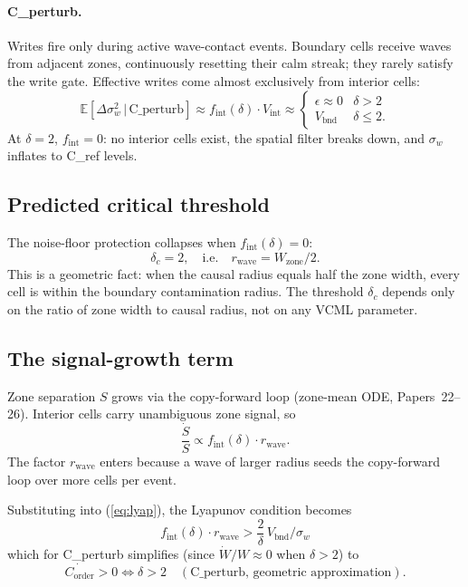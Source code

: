 \documentclass[11pt,a4paper]{article}
\newcommand{\Corder}{C_{\mathrm{order}}}
\newcommand{\sw}{\sigma_w}
\newcommand{\fint}{f_{\mathrm{int}}}
\begin{document}
\paragraph{C\_perturb.}
Writes fire only during active wave-contact events.
Boundary cells receive waves from adjacent zones, continuously resetting their
calm streak; they rarely satisfy the write gate.
Effective writes come almost exclusively from interior cells:
\begin{equation}
  \mathbb{E}[\Delta\sw^2 \,|\, \text{C\_perturb}]
    \approx f_\mathrm{int}(\delta)\cdot V_\mathrm{int}
    \approx \begin{cases}
      \epsilon \approx 0 & \delta > 2 \\
      V_\mathrm{bnd} & \delta \leq 2.
    \end{cases}
\end{equation}
At $\delta=2$, $\fint=0$: no interior cells exist, the spatial filter breaks down,
and $\sw$ inflates to C\_ref levels.

\subsection{Predicted critical threshold}

The noise-floor protection collapses when $\fint(\delta)=0$:
\begin{equation}
  \delta_c = 2, \quad\text{i.e.}\quad r_\mathrm{wave} = W_\mathrm{zone}/2.
\end{equation}
This is a geometric fact: when the causal radius equals half the zone width,
every cell is within the boundary contamination radius. The threshold $\delta_c$
depends only on the ratio of zone width to causal radius, not on any VCML
parameter.

\subsection{The signal-growth term}

Zone separation $S$ grows via the copy-forward loop (zone-mean ODE, Papers~22--26).
Interior cells carry unambiguous zone signal, so
\begin{equation}
  \frac{\dot{S}}{S} \propto \fint(\delta) \cdot r_\mathrm{wave}.
\end{equation}
The factor $r_\mathrm{wave}$ enters because a wave of larger radius seeds the
copy-forward loop over more cells per event.

Substituting into (\ref{eq:lyap}), the Lyapunov condition becomes
\begin{equation}
  \fint(\delta)\cdot r_\mathrm{wave} > \frac{2}{\delta}\,V_\mathrm{bnd}/\sw
\end{equation}
which for C\_perturb simplifies (since $\dot{W}/W \approx 0$ when $\delta>2$) to
\begin{equation}
  \dot{\Corder} > 0 \iff \delta > 2 \quad (\text{C\_perturb, geometric approximation}).
  \label{eq:geom_threshold}
\end{equation}
\end{document}
